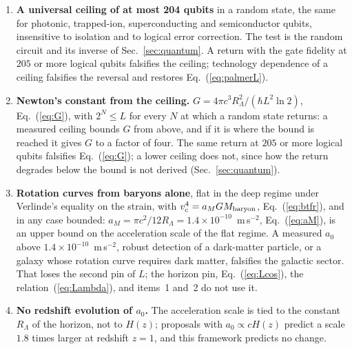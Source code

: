 \documentclass[aps,prd,twocolumn,superscriptaddress,nofootinbib,showkeys]{revtex4-2}
\newcommand{\RL}{R_\Lambda}
\begin{document}
\begin{enumerate}
\item \textbf{A universal ceiling of at most 204 qubits} in a random state, the same for photonic, trapped-ion, superconducting and semiconductor qubits, insensitive to isolation and to logical error correction. The test is the random circuit and its inverse of Sec.~\ref{sec:quantum}. A return with the gate fidelity at $205$ or more logical qubits falsifies the ceiling; technology dependence of a ceiling falsifies the reversal and restores Eq.~(\ref{eq:palmerL}).
\item {\boldmath\textbf{Newton's constant from the ceiling.}} $G = 4\pi c^3\RL^2/(\hbar L^2\ln2)$, Eq.~(\ref{eq:G}), with $2^N\le L$ for every $N$ at which a random state returns: a measured ceiling bounds $G$ from above, and if it is where the bound is reached it gives $G$ to a factor of four. The same return at $205$ or more logical qubits falsifies Eq.~(\ref{eq:G}); a lower ceiling does not, since how the return degrades below the bound is not derived (Sec.~\ref{sec:quantum}).
\item \textbf{Rotation curves from baryons alone}, flat in the deep regime under Verlinde's equality on the strain, with $v_c^4 = a_M G M_{\rm baryon}$, Eq.~(\ref{eq:btfr}), and in any case bounded: $a_M = \pi c^2/12\RL = 1.4\times10^{-10}$~m\,s$^{-2}$, Eq.~(\ref{eq:aM}), is an upper bound on the acceleration scale of the flat regime. A measured $a_0$ above $1.4\times10^{-10}$~m\,s$^{-2}$, robust detection of a dark-matter particle, or a galaxy whose rotation curve requires dark matter, falsifies the galactic sector. That loses the second pin of $L$; the horizon pin, Eq.~(\ref{eq:Lcos}), the relation~(\ref{eq:Lambda}), and items~1 and~2 do not use it.
\item {\boldmath\textbf{No redshift evolution of $a_0$.}} The acceleration scale is tied to the constant $\RL$ of the horizon, not to $H(z)$; proposals with $a_0\propto cH(z)$ predict a scale $1.8$ times larger at redshift $z=1$, and this framework predicts no change.

\end{enumerate}
\end{document}
